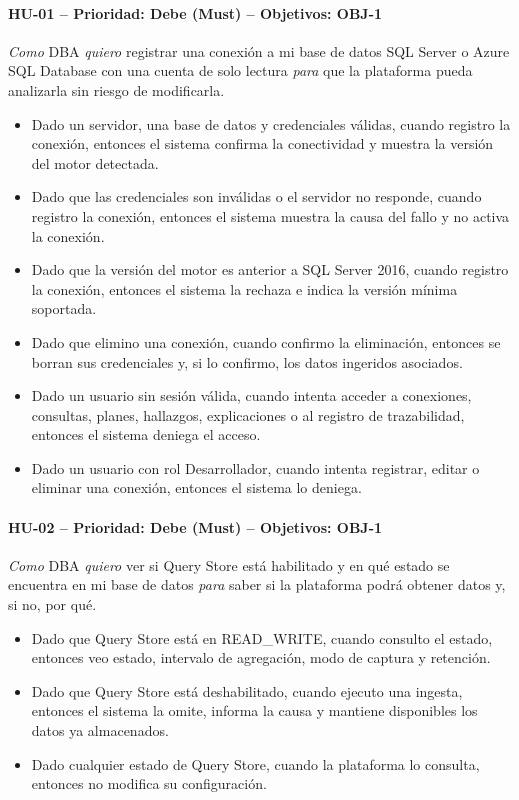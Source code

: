 \documentclass[11pt,a4paper]{report}
\begin{document}
\paragraph{HU-01 -- Prioridad: Debe (Must) -- Objetivos: OBJ-1}
\textit{Como} DBA \textit{quiero} registrar una conexión a mi base de datos SQL Server o Azure SQL Database con una cuenta de solo lectura \textit{para} que la plataforma pueda analizarla sin riesgo de modificarla.
\begin{itemize}[leftmargin=1.3em,itemsep=1pt]
\item[\textbf{CA-HU01.1}] Dado un servidor, una base de datos y credenciales válidas, cuando registro la conexión, entonces el sistema confirma la conectividad y muestra la versión del motor detectada.
\item[\textbf{CA-HU01.2}] Dado que las credenciales son inválidas o el servidor no responde, cuando registro la conexión, entonces el sistema muestra la causa del fallo y no activa la conexión.
\item[\textbf{CA-HU01.3}] Dado que la versión del motor es anterior a SQL Server 2016, cuando registro la conexión, entonces el sistema la rechaza e indica la versión mínima soportada.
\item[\textbf{CA-HU01.4}] Dado que elimino una conexión, cuando confirmo la eliminación, entonces se borran sus credenciales y, si lo confirmo, los datos ingeridos asociados.
\item[\textbf{CA-HU01.5}] Dado un usuario sin sesión válida, cuando intenta acceder a conexiones, consultas, planes, hallazgos, explicaciones o al registro de trazabilidad, entonces el sistema deniega el acceso.
\item[\textbf{CA-HU01.6}] Dado un usuario con rol Desarrollador, cuando intenta registrar, editar o eliminar una conexión, entonces el sistema lo deniega.
\end{itemize}

\paragraph{HU-02 -- Prioridad: Debe (Must) -- Objetivos: OBJ-1}
\textit{Como} DBA \textit{quiero} ver si Query Store está habilitado y en qué estado se encuentra en mi base de datos \textit{para} saber si la plataforma podrá obtener datos y, si no, por qué.
\begin{itemize}[leftmargin=1.3em,itemsep=1pt]
\item[\textbf{CA-HU02.1}] Dado que Query Store está en READ\_WRITE, cuando consulto el estado, entonces veo estado, intervalo de agregación, modo de captura y retención.
\item[\textbf{CA-HU02.2}] Dado que Query Store está deshabilitado, cuando ejecuto una ingesta, entonces el sistema la omite, informa la causa y mantiene disponibles los datos ya almacenados.
\item[\textbf{CA-HU02.3}] Dado cualquier estado de Query Store, cuando la plataforma lo consulta, entonces no modifica su configuración.
\end{itemize}
\end{document}
